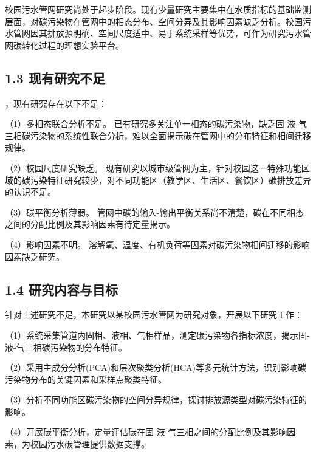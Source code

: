 校园污水管网研究尚处于起步阶段。现有少量研究主要集中在水质指标的基础监测层面，对碳污染物在管网中的相态分布、空间分异及其影响因素缺乏分析。校园污水管网因其排放源明确、空间尺度适中、易于系统采样等优势，可作为研究污水管网碳转化过程的理想实验平台。

\subsection{1.3 现有研究不足}

，现有研究存在以下不足：

（1）多相态联合分析不足。 已有研究多关注单一相态的碳污染物，缺乏固-液-气三相碳污染物的系统性联合分析，难以全面揭示碳在管网中的分布特征和相间迁移规律。

（2）校园尺度研究缺乏。 现有研究以城市级管网为主，针对校园这一特殊功能区域的碳污染特征研究较少，对不同功能区（教学区、生活区、餐饮区）碳排放差异的认识不足。

（3）碳平衡分析薄弱。 管网中碳的输入-输出平衡关系尚不清楚，碳在不同相态之间的分配比例及其影响因素有待定量揭示。

（4）影响因素不明。 溶解氧、温度、有机负荷等因素对碳污染物相间迁移的影响因素缺乏研究。

\subsection{1.4 研究内容与目标}

针对上述研究不足，本研究以某校园污水管网为研究对象，开展以下研究工作：

（1）系统采集管道内固相、液相、气相样品，测定碳污染物各指标浓度，揭示固-液-气三相碳污染物的分布特征。

（2）采用主成分分析(PCA)和层次聚类分析(HCA)等多元统计方法，识别影响碳污染物分布的关键因素和采样点聚类特征。

（3）分析不同功能区碳污染物的空间分异规律，探讨排放源类型对碳污染特征的影响。

（4）开展碳平衡分析，定量评估碳在固-液-气三相之间的分配比例及其影响因素，为校园污水碳管理提供数据支撑。